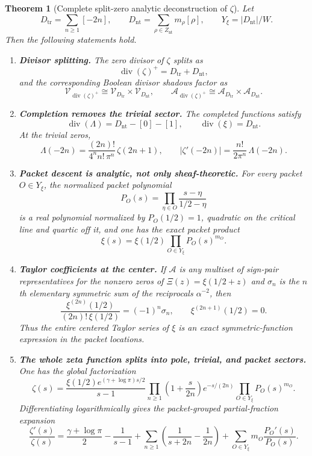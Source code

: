 \documentclass[11pt,a4paper]{article}
\numberwithin{equation}{section}
\newtheorem{theorem}{Theorem}[section]
\theoremstyle{definition}
\theoremstyle{remark}
\DeclareMathOperator{\divv}{div}
\newcommand{\cV}{\mathcal V}
\newcommand{\cA}{\mathcal A}
\begin{document}
\begin{theorem}[Complete split-zero analytic deconstruction of $\zeta$]\label{P2:thm:final-summary}
Let
\[
D_{\mathrm{tr}}=\sum_{n\ge 1}[-2n],
\qquad
D_{\mathrm{nt}}=\sum_{\rho\in Z_{\mathrm{nt}}}m_\rho[\rho],
\qquad
Y_\xi=|D_{\mathrm{nt}}|/W.
\]
Then the following statements hold.

\begin{enumerate}[label=(\arabic*)]
\item \textbf{Divisor splitting.}
The zero divisor of $\zeta$ splits as
\[
\divv(\zeta)^+=D_{\mathrm{tr}}+D_{\mathrm{nt}},
\]
and the corresponding Boolean divisor shadows factor as
\[
\cV_{\divv(\zeta)^+}\cong \cV_{D_{\mathrm{tr}}}\times \cV_{D_{\mathrm{nt}}},
\qquad
\cA_{\divv(\zeta)^+}\cong \cA_{D_{\mathrm{tr}}}\times \cA_{D_{\mathrm{nt}}}.
\]

\item \textbf{Completion removes the trivial sector.}
The completed functions satisfy
\[
\divv(\Lambda)=D_{\mathrm{nt}}-[0]-[1],
\qquad
\divv(\xi)=D_{\mathrm{nt}}.
\]
At the trivial zeros,
\[
\Lambda(-2n)=\frac{(2n)!}{4^n n!\,\pi^n}\,\zeta(2n+1),
\qquad
\bigl|\zeta'(-2n)\bigr|=\frac{n!}{2\pi^n}\,\Lambda(-2n).
\]

\item \textbf{Packet descent is analytic, not only sheaf-theoretic.}
For every packet $O\in Y_\xi$, the normalized packet polynomial
\[
P_O(s)=\prod_{\eta\in O}\frac{s-\eta}{1/2-\eta}
\]
is a real polynomial normalized by $P_O(1/2)=1$, quadratic on the critical line and quartic off it, and one has the exact packet product
\[
\xi(s)=\xi(1/2)\prod_{O\in Y_\xi} P_O(s)^{m_O}.
\]

\item \textbf{Taylor coefficients at the center.}
If $\mathcal A$ is any multiset of sign-pair representatives for the nonzero zeros of $\Xi(z)=\xi(1/2+z)$ and $\sigma_n$ is the $n$th elementary symmetric sum of the reciprocals $\alpha^{-2}$, then
\[
\frac{\xi^{(2n)}(1/2)}{(2n)!\,\xi(1/2)}=(-1)^n\sigma_n,
\qquad
\xi^{(2n+1)}(1/2)=0.
\]
Thus the entire centered Taylor series of $\xi$ is an exact symmetric-function expression in the packet locations.

\item \textbf{The whole zeta function splits into pole, trivial, and packet sectors.}
One has the global factorization
\[
\zeta(s)
=
\frac{\xi(1/2)e^{(\gamma+\log\pi)s/2}}{s-1}
\prod_{n\ge 1}\left(1+\frac{s}{2n}\right)e^{-s/(2n)}
\prod_{O\in Y_\xi} P_O(s)^{m_O}.
\]
Differentiating logarithmically gives the packet-grouped partial-fraction expansion
\[
\frac{\zeta'(s)}{\zeta(s)}
=
\frac{\gamma+\log\pi}{2}
-\frac{1}{s-1}
+\sum_{n\ge 1}\left(\frac{1}{s+2n}-\frac{1}{2n}\right)
+\sum_{O\in Y_\xi} m_O\frac{P_O'(s)}{P_O(s)}.
\]


\end{enumerate}
\end{theorem}
\end{document}
